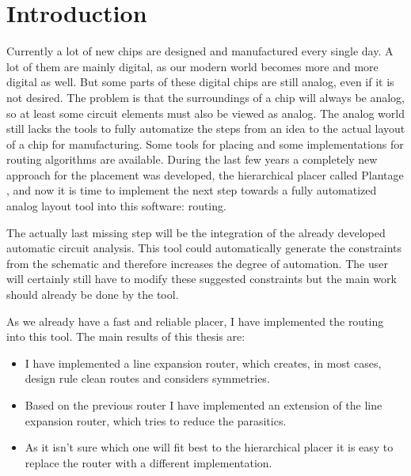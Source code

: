 \chapter{Introduction}

Currently a lot of new chips are designed and manufactured every single day. A lot of them are mainly digital, as our modern world becomes more and more digital as well. But some parts of these digital chips are still analog, even if it is not desired. The problem is that the surroundings of a chip will always be analog, so at least some circuit elements must also be viewed as analog. The analog world still lacks the tools to fully automatize the steps from an idea to the actual layout of a chip for manufacturing. Some tools for placing and some implementations for routing algorithms are available. During the last few years a completely new approach for the placement was developed, the hierarchical placer called Plantage \cite{iccad:plantage}, and now it is time to implement the next step towards a fully automatized analog layout tool into this software: routing.

The actually last missing step will be the integration of the already developed automatic circuit analysis. This tool could automatically generate the constraints from the schematic and therefore increases the degree of automation. The user will certainly still have to modify these suggested constraints but the main work should already be done by the tool.

As we already have a fast and reliable placer, I have implemented the routing into this tool. The main results of this thesis are:
\begin{itemize}
\item I have implemented a line expansion router, which creates, in most cases, design rule clean routes and considers symmetries.
\item Based on the previous router I have implemented an extension of the line expansion router, which tries to reduce the parasitics.
\item As it isn't sure which one will fit best to the hierarchical placer it is easy to replace the router with a different implementation.
\end{itemize}